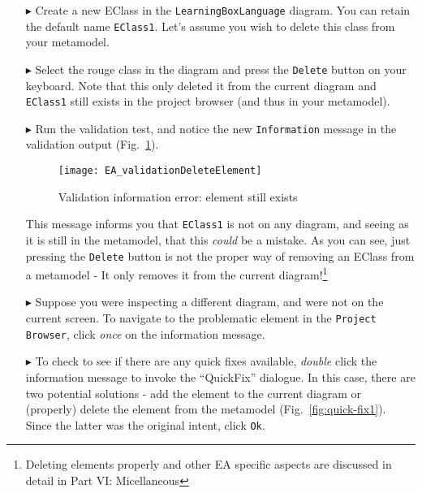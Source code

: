 \begin{enumerate}
\item[$\blacktriangleright$] Create a new EClass in the \texttt{Learning\-Box\-Language} diagram. You can retain the default name \texttt{EClass1}. Let's
assume you wish to delete this class from your metamodel.

\item[$\blacktriangleright$] Select the rouge class in the diagram and press the \texttt{Delete} button on your keyboard. Note that this only deleted it from
the current diagram and \texttt{EClass1} still exists in the project browser (and thus in your metamodel).

\item[$\blacktriangleright$] Run the validation test, and notice the new \texttt{Information} message in the validation output
(Fig.~\ref{fig:validation_information}).

\begin{figure}[htbp]
	\centering
  \texttt{[image: EA\_validationDeleteElement]}
	\caption{Validation information error: element still exists}
	\label{fig:validation_information}
\end{figure}

This message informs you that \texttt{EClass1} is not on any diagram, and seeing as it is still in the metamodel, that this \emph{could} be a mistake. As you
can see, just pressing the \texttt{Delete} button is not the proper way of removing an EClass from a metamodel - It only removes it from the current
diagram!\footnote{Deleting elements properly and other EA specific aspects are discussed in detail in Part VI: Micellaneous}

\item[$\blacktriangleright$] Suppose you were inspecting a different diagram, and were not on the current screen. To navigate to the problematic element in the
\texttt{Project Browser}, click \emph{once} on the information message.

\newpage

\item[$\blacktriangleright$] To check to see if there are any quick fixes available, \emph{double} click the information message to invoke the ``QuickFix''
dialogue. In this case, there are two potential solutions - add the element to the current diagram or (properly) delete the element from the metamodel
(Fig.~\ref{fig:quick-fix1}). Since the latter was the original intent, click \texttt{Ok}.

\vspace{0.5cm}


\end{enumerate}
